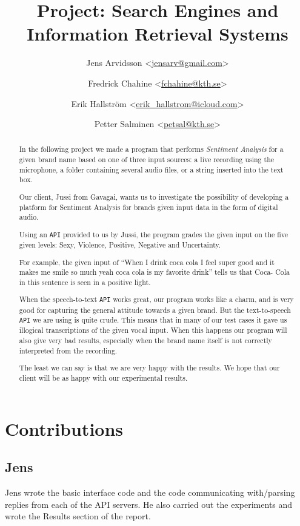\documentclass[a4paper,12pt,twoside]{ltxdoc}
\title{Project: Search Engines and Information Retrieval Systems}
\author{
Jens Arvidsson <\href{mailto:jensarv@gmail.com}{jensarv@gmail.com}> \and
Fredrick Chahine <\href{mailto:fchahine@kth.se}{fchahine@kth.se}> \and
Erik Hallström  <\href{mailto:erik_hallstrom@icloud.com}{erik\_hallstrom@icloud.com}> \and
Petter Salminen <\href{mailto:petsal@kth.se}{petsal@kth.se}>}
\begin{document}
\maketitle
\tableofcontents

\newpage
\begin{abstract}
In the following project we made a program that performs \emph{Sentiment Analysis} for a given brand name based on one of three input sources: a live recording using the microphone, a folder containing several audio files, or a string inserted into the text box.

Our client, Jussi from Gavagai, wants us to investigate the possibility of developing a platform for Sentiment Analysis for brands given input data in the form of digital audio.

Using an \verb#API# provided to us by Jussi, the program grades the given input on the five given levels: Sexy, Violence, Positive, Negative and Uncertainty. 

For example, the given input of ``When I drink coca cola I feel super good and it makes me smile so much yeah coca cola is my favorite drink'' tells us that Coca- Cola in this sentence is seen in a positive light. 

When the speech-to-text \verb#API# works great, our program works like a charm, and is very good for capturing the general attitude towards a given brand. But the text-to-speech \verb#API# we are using is quite crude. This means that in many of our test cases it gave us illogical transcriptions of the given vocal input. When this happens our program will also give very bad results, especially when the brand name itself is not correctly interpreted from the recording.

The least we can say is that we are very happy with the results. We hope that our client will be as happy with our experimental results.
\end{abstract}

\section{Contributions}
\subsection{Jens}
Jens wrote the basic interface code and the code communicating with/parsing replies from each of the API servers. He also carried out the experiments and wrote the Results section of the report.
\end{document}
